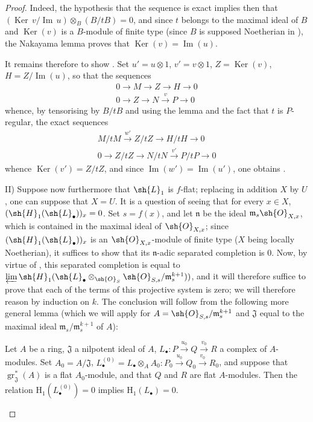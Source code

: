 \begin{proof}
Indeed, the hypothesis that the sequence  is exact implies then that $(\operatorname{Ker}\,v/\operatorname{Im}\,u)\otimes_B(B/tB)=0$, and since $t$ belongs to the maximal ideal of $B$ and $\operatorname{Ker}(v)$ is a $B$-module of finite type (since $B$ is supposed Noetherian in ), the Nakayama lemma proves that $\operatorname{Ker}(v)=\operatorname{Im}(u)$.

It remains therefore to show .
Set $u'=u\otimes 1$, $v'=v\otimes 1$, $Z=\operatorname{Ker}(v)$, $H=Z/\operatorname{Im}(u)$, so that the sequences
\begin{gather*}
  0\to M\to Z\to H\to 0\\
  0\to Z\to N\xrightarrow{v} P\to 0
\end{gather*}
whence, by tensorising by $B/tB$ and using the lemma  and the fact that $t$ is $P$-regular, the exact sequences
\begin{gather*}
  M/tM \xrightarrow{w'} Z/tZ \to H/tH \to 0\\
  0\to Z/tZ \to N/tN \xrightarrow{v'} P/tP \to 0
\end{gather*}
whence $\operatorname{Ker}(v')=Z/tZ$, and since $\operatorname{Im}(w')=\operatorname{Im}(u')$, one obtains .

\medskip
II) Suppose now furthermore that $\sh{L}_1$ is $f$-flat; replacing in addition $X$ by $U$, one can suppose that $X=U$.
It is a question of seeing that for every $x\in X$, $(\sh{H}_1(\sh{L}_\bullet))_x=0$.
Set $s=f(x)$, and let $\mathfrak{n}$ be the ideal $\mathfrak{m}_s\sh{O}_{X,x}$, which is contained in the maximal ideal of $\sh{O}_{X,x}$; since $(\sh{H}_1(\sh{L}_\bullet))_x$ is an $\sh{O}_{X,x}$-module of finite type ($X$ being locally Noetherian), it suffices to show that its $\mathfrak{n}$-adic separated completion is $0$.
Now, by virtue of , this separated completion is equal to $\varprojlim\sh{H}_1(\sh{L}_\bullet\otimes_{\sh{O}_S}\sh{O}_{S,s}/\mathfrak{m}_s^{k+1}))$, and it will therefore suffice to prove that each of the terms of this projective system is zero; we will therefore reason by induction on $k$.
The conclusion will follow from the following more general lemma (which we will apply for $A=\sh{O}_{S,s}/\mathfrak{m}_s^{k+1}$ and $\mathfrak{J}$ equal to the maximal ideal $\mathfrak{m}_s/\mathfrak{m}_s^{k+1}$ of $A$):

\begin{lemma}[12.3.3.5]
\label{IV.12.3.3.5}
Let $A$ be a ring, $\mathfrak{J}$ a nilpotent ideal of $A$, $L_\bullet:P\xrightarrow{u_0}Q\xrightarrow{v_0}R$ a complex of $A$-modules.
Set $A_0=A/\mathfrak{J}$, $L_\bullet^{(0)}=L_\bullet\otimes_A A_0:P_0\xrightarrow{u_0}Q_0\xrightarrow{v_0}R_0$, and suppose that $\operatorname{gr}_{\mathfrak{J}}^*(A)$ is a flat $A_0$-module, and that $Q$ and $R$ are flat $A$-modules.
Then the relation $\mathrm{H}_1(L_\bullet^{(0)})=0$ implies $\mathrm{H}_1(L_\bullet)=0$.
\end{lemma}


\end{proof}
